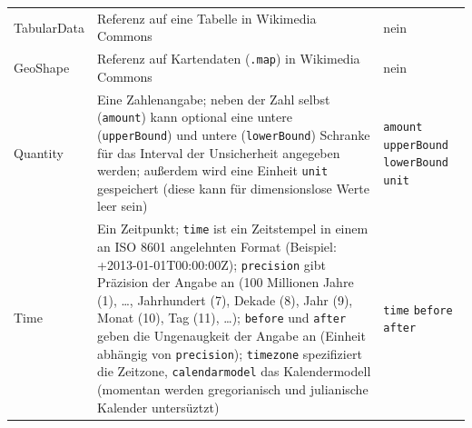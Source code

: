 \begin{table}
\begin{adjustwidth}{-1cm}{-1cm}
\begin{minipage}{\textwidth}
\begin{tabular}{l p{} p{}}
      TabularData      & Referenz auf eine Tabelle in Wikimedia Commons                                                                                                                & nein \\
      GeoShape         & Referenz auf Kartendaten (\verb|.map|) in Wikimedia Commons                                                                                                   & nein \\
      Quantity         & Eine Zahlenangabe; neben der Zahl selbst (\verb|amount|) kann optional eine untere (\verb|upperBound|) und untere (\verb|lowerBound|) Schranke für das
                         Interval der Unsicherheit angegeben werden; außerdem wird eine Einheit \verb|unit| gespeichert (diese kann für dimensionslose Werte leer sein)                & \verb|amount|\newline{}
                                                                                                                                                                                         \verb|upperBound|\newline{}
                                                                                                                                                                                         \verb|lowerBound|\newline{}
                                                                                                                                                                                         \verb|unit| \\
      Time             & Ein Zeitpunkt; \verb|time| ist ein Zeitstempel in einem an ISO 8601 angelehnten Format (Beispiel: +2013-01-01T00:00:00Z);
                         \verb|precision| gibt Präzision der Angabe an (100 Millionen Jahre (1), \ldots, Jahrhundert (7), Dekade (8), Jahr (9), Monat (10), Tag (11), \ldots);
                         \verb|before| und \verb|after| geben die Ungenaugkeit der Angabe an (Einheit abhängig von \verb|precision|);
                         \verb|timezone| spezifiziert die Zeitzone, \verb|calendarmodel| das Kalendermodell (momentan werden gregorianisch und julianische Kalender untersüztzt)            & \verb|time|\newline{}
                                                                                                                                                                                         \verb|before|\newline{}
                                                                                                                                                                                         \verb|after|\newline{}

\end{tabular}
\end{minipage}
\end{adjustwidth}
\end{table}
